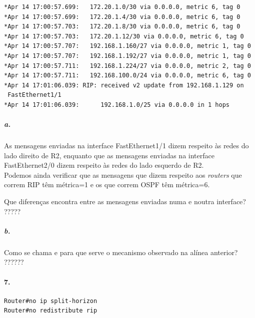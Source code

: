 \begin{verbatim}
*Apr 14 17:00:57.699: 	172.20.1.0/30 via 0.0.0.0, metric 6, tag 0
*Apr 14 17:00:57.699: 	172.20.1.4/30 via 0.0.0.0, metric 6, tag 0
*Apr 14 17:00:57.703: 	172.20.1.8/30 via 0.0.0.0, metric 6, tag 0
*Apr 14 17:00:57.703: 	172.20.1.12/30 via 0.0.0.0, metric 6, tag 0
*Apr 14 17:00:57.707: 	192.168.1.160/27 via 0.0.0.0, metric 1, tag 0
*Apr 14 17:00:57.707: 	192.168.1.192/27 via 0.0.0.0, metric 1, tag 0
*Apr 14 17:00:57.711: 	192.168.1.224/27 via 0.0.0.0, metric 2, tag 0
*Apr 14 17:00:57.711: 	192.168.100.0/24 via 0.0.0.0, metric 6, tag 0
*Apr 14 17:01:06.039: RIP: received v2 update from 192.168.1.129 on
 FastEthernet1/1
*Apr 14 17:01:06.039:      192.168.1.0/25 via 0.0.0.0 in 1 hops
\end{verbatim}

\subparagraph{a.}
As mensagens enviadas na interface FastEthernet1/1 dizem respeito às redes do lado direito de \textsf{R2}, enquanto que as mensagens enviadas na interface FastEthernet2/0 dizem respeito às redes do lado esquerdo de \textsf{R2}.\\
Podemos ainda verificar que as mensagens que dizem respeito aos \emph{routers} que correm RIP têm métrica=1 e os que correm OSPF têm métrica=6.

Que diferenças encontra entre as mensagens enviadas numa e noutra interface?  ?????

\subparagraph{b.}
Como se chama e para que serve o mecanismo observado na alínea anterior?   ??????

\paragraph{7.}
\begin{verbatim}
Router#no ip split-horizon
Router#no redistribute rip
\end{verbatim}


